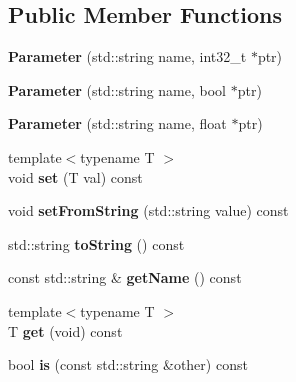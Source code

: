 \subsection*{Public Member Functions}
\begin{DoxyCompactItemize}
\item 
\mbox{\label{structParameter_a1529a9593f0d6397439cf1f7d4874266}} 
{\bfseries Parameter} (std\+::string name, int32\+\_\+t $\ast$ptr)
\item 
\mbox{\label{structParameter_a6dccdb5cbbeaf5aa2298b479bb28ab44}} 
{\bfseries Parameter} (std\+::string name, bool $\ast$ptr)
\item 
\mbox{\label{structParameter_a051e8f7e9a4f99caf62846b669a086d3}} 
{\bfseries Parameter} (std\+::string name, float $\ast$ptr)
\item 
\mbox{\label{structParameter_a8a7228e3493aad31fba8e69dae6f99df}} 
{\footnotesize template$<$typename T $>$ }\\void {\bfseries set} (T val) const
\item 
\mbox{\label{structParameter_acbc6eaf8bdc630ccc51dde12aca77d18}} 
void {\bfseries set\+From\+String} (std\+::string value) const
\item 
\mbox{\label{structParameter_af212e2c16e2d4de8019138ebde3aa7bf}} 
std\+::string {\bfseries to\+String} () const
\item 
\mbox{\label{structParameter_a18097b115fea4db92ea394f14f3a7aab}} 
const std\+::string \& {\bfseries get\+Name} () const
\item 
\mbox{\label{structParameter_afbe10baf73703aa03b24f75c5d7b860a}} 
{\footnotesize template$<$typename T $>$ }\\T {\bfseries get} (void) const
\item 
\mbox{\label{structParameter_af25a0a7eeab02ad47a5e1a129863ddf9}} 
bool {\bfseries is} (const std\+::string \&other) const
\end{DoxyCompactItemize}
